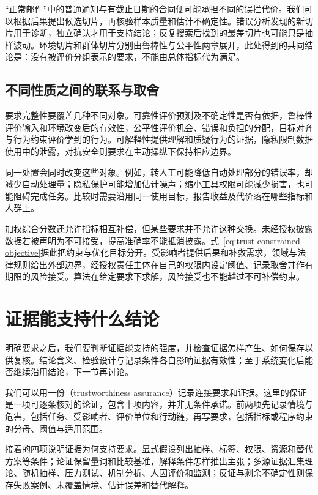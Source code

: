 “正常邮件”中的普通通知与有截止日期的合同便可能承担不同的误拦代价。我们可以根据后果提出候选切片，再核验样本质量和估计不确定性。错误分析发现的新切片用于诊断，独立确认才用于支持结论；反复搜索后找到的最差切片也可能只是抽样波动。环境切片和群体切片分别由鲁棒性与公平性两章展开，此处得到的共同结论是：没有被评价分组表示的要求，不能由总体指标代为满足。

\subsection{不同性质之间的联系与取舍}

要求完整性要覆盖几种不同对象。可靠性评价预测及不确定性是否有依据，鲁棒性评价输入和环境改变后的有效性，公平性评价机会、错误和负担的分配，目标对齐与行为约束评价学到的行为。可解释性提供理解和质疑行为的证据，隐私限制数据使用中的泄露，对抗安全则要求在主动操纵下保持相应边界。

同一处置会同时改变这些对象。例如，转人工可能降低自动处理部分的错误率，却减少自动处理量；隐私保护可能增加估计噪声；缩小工具权限可能减少损害，也可能阻碍完成任务。比较时需要沿用同一使用目标，报告收益及代价落在哪些指标和人群上。

加权综合分数还允许指标相互补偿，但某些要求并不允许这种交换。未经授权披露数据若被声明为不可接受，提高准确率不能抵消披露。式~\eqref{eq:trust-constrained-objective}据此把约束与优化目标分开。受影响者提供后果和补救需求，领域与法律规则给出外部边界，经授权责任主体在自己的权限内设定阈值、记录取舍并作有期限的风险接受。算法在给定要求下求解，风险接受也不能越过不可补偿约束。

\section{证据能支持什么结论}
\label{sec:trust-evidence}

明确要求之后，我们要判断证据能支持的强度，并检查证据怎样产生、如何保存以供复核。结论含义、检验设计与记录条件各自影响证据有效性；至于系统变化后能否继续沿用结论，下一节再讨论。

我们可以用一份（trustworthiness assurance）记录连接要求和证据。这里的保证是一项可逐条核对的论证，包含十项内容，并非无条件承诺。前两项先记录情境与危害，包括任务、受影响者、评价单位和行动链，再写要求，包括指标或程序约束的分母、阈值与适用范围。

接着的四项说明证据为何支持要求。显式假设列出抽样、标签、权限、资源和替代方案等条件；论证保留量词和比较基准，解释条件怎样推出主张；多源证据汇集理论、随机抽样、压力测试、机制分析、人因评价和监测；反证与剩余不确定性则保存失败案例、未覆盖情境、估计误差和替代解释。


